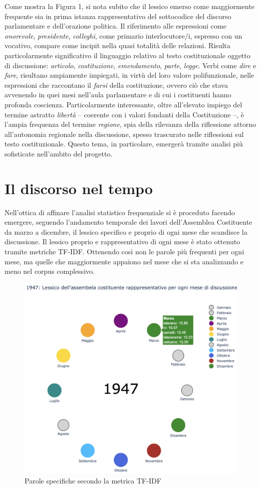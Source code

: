 \documentclass{article}
\begin{document}
Come mostra la Figura 1, si nota subito che il lessico emerso come maggiormente frequente sia in prima istanza rappresentativo del sottocodice del discorso parlamentare e dell’orazione politica. Il riferimento alle espressioni come \textit{onorevole}, \textit{presidente}, \textit{colleghi}, come primario interlocutore/i, espresso con un vocativo, compare come incipit nella quasi totalità delle relazioni. Risulta particolarmente significativo il linguaggio relativo al testo costituzionale oggetto di discussione: \textit{articolo}, \textit{costituzione}, \textit{emendamento}, \textit{parte}, \textit{legge}. 
Verbi come \textit{dire} e \textit{fare}, risultano ampiamente impiegati, in virtù del loro valore polifunzionale, nelle espressioni che raccontano il \textit{farsi} della costituzione, ovvero ciò che stava avvenendo in quei mesi nell’aula parlamentare e di cui i costituenti hanno profonda coscienza.  Particolarmente interessante, oltre all’elevato impiego del termine astratto \textit{libertà} – coerente con i valori fondanti della Costituzione –, è l’ampia frequenza del termine \textit{regione}, spia della rilevanza della riflessione attorno all’autonomia regionale nella discussione, spesso trascurato nelle riflessioni sul testo costituzionale. Questo tema, in particolare, emergerà tramite analisi più sofisticate nell’ambito del progetto.


\section{Il discorso nel tempo}

Nell'ottica di affinare l'analisi statistico frequenziale si è proceduto facendo emergere, seguendo l'andamento temporale dei lavori dell'Assemblea Costituente da marzo a dicembre, il lessico specifico e proprio di ogni mese che scandisce la discussione. Il lessico proprio e rappresentativo di ogni mese è stato ottenuto tramite metriche TF-IDF. Ottenendo così non le parole più frequenti per ogni mese, ma quelle che maggiormente appaiono nel mese che si sta analizzando e meno nel corpus complessivo. 

\begin{figure}[H]
    \centering
    \includegraphics[width=0.5\linewidth]{TF_IDF.png}
    \caption{Parole specifiche secondo la metrica TF-IDF}
    \label{fig:enter-label}
\end{figure}
\end{document}
